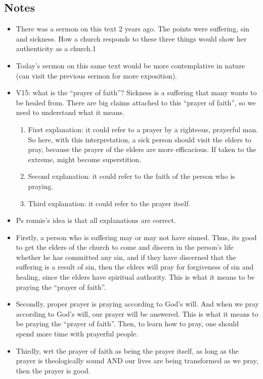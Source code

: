 \subsection*{Notes}
\begin{itemize}
  \item There was a sermon on this text 2 years ago. The points were suffering, sin and sickness. How a church responds to these three things would show her authenticity as a church.1
  \item Today’s sermon on this same text would be more contemplative in nature (can visit the previous sermon for more exposition).
  \item V15: what is the “prayer of faith”? Sickness is a suffering that many wants to be healed from. There are big claims attached to this “prayer of faith”, so we need to understand what it means. 
  \begin{enumerate}
    \item First explanation: it could refer to a prayer by a righteous, prayerful man. So here, with this interpretation, a sick person should visit the elders to pray, because the prayer of the elders are more efficacious. If taken to the extreme, might become superstition.
    \item Second explanation: it could refer to the faith of the person who is praying. 
    \item Third explanation: it could refer to the prayer itself.
  \end{enumerate}
  \item Ps ronnie’s idea is that all explanations are correct. 
  \item Firstly, a person who is suffering may or may not have sinned. Thus, its good to get the elders of the church to come and discern in the person’s life whether he has committed any sin, and if they have discerned that the suffering is a result of sin, then the elders will pray for forgiveness of sin and healing, since the elders have spiritual authority. This is what it means to be praying the “prayer of faith”.
  \item Secondly, proper prayer is praying according to God’s will. And when we pray according to God’s will, our prayer will be answered. This is what it means to be praying the “prayer of faith”. Then, to learn how to pray, one should spend more time with prayerful people. 
  \item Thirdly, wrt the prayer of faith as being the prayer itself, as long as the prayer is theologically sound AND our lives are being transformed as we pray, then the prayer is good.
\end{itemize}